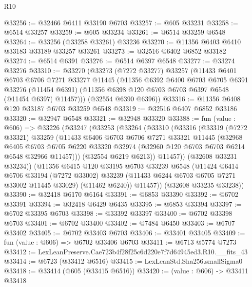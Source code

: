 \begin{lexlean}{R10}
\begin{coremodule}
@33256 := @32466 @6411 @33190 @6703
@33257 := @605 @33231
@33258 := @6514 @33257
@33259 := @605 @33234
@33261 := @6514 @33259 @6548
@33264 := @33256 (@33258 @33261) @33236
@33270 := @11356 @6403 @6410 @33183 @33189 @33257 @33261
@33273 := @32516 @6402 @6852 @33182
@33274 := @6514 @6391
@33276 := @6514 @6397 @6548
@33277 := @33274 @33276
@33310 := @33270
    (@33273
      (@7272 @33277)
      @33257
      (@11433
        @6401
        @6703
        @6706
        @7271
        @33277
        @11445
        (@11356
          @6392
          @6400
          @6703
          @6705
          @6391
          @33276
          (@11454 @6391)
          (@11356 @6398 @120 @6703 @6703 @6397 @6548 (@11454 @6397) @11457)))
      (@32554 @6390 @6396))
@33316 := @11356 @6408 @120 @33187 @6703 @33259 @6548
@33319 := @32516 @6407 @6852 @33186
@33320 := @32947 @6548
@33321 := @32948 @33320
@33388 := fun (value : @606) =>
  @33226
    (@33247
      (@33253
        (@33264
          (@33310
            (@33316
              (@33319
                (@7272 @33321)
                @33259
                (@11433
                  @6406
                  @6703
                  @6706
                  @7271
                  @33321
                  @11445
                  (@32968
                    @6405
                    @6703
                    @6705
                    @6220
                    @33320
                    @32974
                    (@32960 @120 @6703 @6703 @6214 @6548 @32966 @11457)))
                (@32554 @6219 @6213))
              @11457))
          (@32608 @33231 @33234))
        (@11356
          @6415
          @120
          @33195
          @6703
          @33239
          @6548
          (@11424
            @6414
            @6706
            @33194
            (@7272 @33002)
            @33239
            (@11433 @6244 @6703 @6705 @7271 @33002 @11445 @33029)
            (@11462 @6240))
          @11457))
      (@32608 @33235 @33238))
@33390 := @32418 @6170 @6164
@33391 := @6853 @33390
@33392 := @6702 @33391
@33394 := @32418 @6429 @6435
@33395 := @6853 @33394
@33397 := @6702 @33395 @6703
@33398 := @33392 @33397
@33400 := @6702 @33398 @6703
@33401 := @6702 @33400
@33402 := @7484 @6450
@33403 := @6707 @33402
@33405 := @6702 @33403 @6703
@33406 := @33401 @33405
@33409 := fun (value : @606) => @6702 @33406 @6703
@33411 := @6713 @5774 @7273
@33412 := LexLeanPreserve.Cae723b4f28f25c6d220e7f7d64945ed3.R10.__fits_43
@33414 := @6723 (@33412 @6516)
@33415 := LexLeanStd.Sha256.smallSigma0
@33418 := @33414 (@605 (@33415 @6516))
@33420 := (value : @606) -> @33411 @33418

\end{coremodule}
\end{lexlean}
